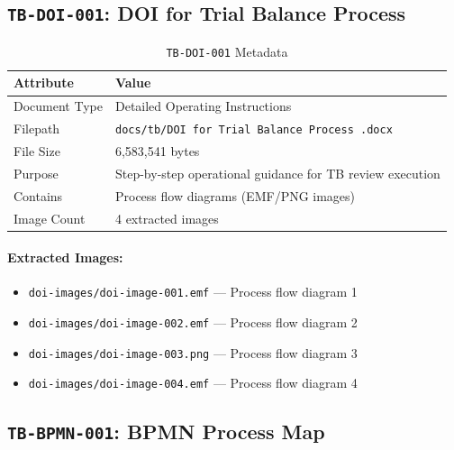 \documentclass[11pt,a4paper,twoside]{report}
\newcommand{\srcref}[1]{\texttt{#1}}
\begin{document}
\subsection{\srcref{TB-DOI-001}: DOI for Trial Balance Process}
\label{sec:tb-doi-001}

\begin{table}[h]
\centering
\caption{\srcref{TB-DOI-001} Metadata}
\begin{tabularx}{\textwidth}{@{}L{4cm}L{10cm}@{}}
\toprule
\textbf{Attribute} & \textbf{Value} \\
\midrule
Document Type & Detailed Operating Instructions \\
Filepath & \texttt{docs/tb/DOI for Trial Balance Process .docx} \\
File Size & 6,583,541 bytes \\
Purpose & Step-by-step operational guidance for TB review execution \\
Contains & Process flow diagrams (EMF/PNG images) \\
Image Count & 4 extracted images \\
\bottomrule
\end{tabularx}
\end{table}

\paragraph{Extracted Images:}
\begin{itemize}[noitemsep]
\item \texttt{doi-images/doi-image-001.emf} --- Process flow diagram 1
\item \texttt{doi-images/doi-image-002.emf} --- Process flow diagram 2
\item \texttt{doi-images/doi-image-003.png} --- Process flow diagram 3
\item \texttt{doi-images/doi-image-004.emf} --- Process flow diagram 4
\end{itemize}

\subsection{\srcref{TB-BPMN-001}: BPMN Process Map}
\label{sec:tb-bpmn-001}
\end{document}
